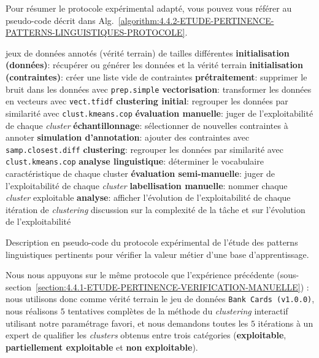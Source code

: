 			Pour résumer le protocole expérimental adapté, vous pouvez vous référer au pseudo-code décrit dans Alg.~\ref{algorithm:4.4.2-ETUDE-PERTINENCE-PATTERNS-LINGUISTIQUES-PROTOCOLE}.
			\begin{algorithm}[!htb]
				\begin{algorithmic}[1]
					\Require jeux de données annotés (vérité terrain) de tailles différentes
					\State \textbf{initialisation (données)}: récupérer ou générer les données et la vérité terrain
					\State \textbf{initialisation (contraintes)}: créer une liste vide de contraintes
					\State \textbf{prétraitement}: supprimer le bruit dans les données avec \texttt{prep.simple}
					\State \textbf{vectorisation}: transformer les données en vecteurs avec \texttt{vect.tfidf}
					\State \textbf{clustering initial}: regrouper les données par similarité avec \texttt{clust.kmeans.cop}
					\State \textbf{évaluation manuelle}: juger de l'exploitabilité de chaque \textit{cluster}
					\Repeat
						\State \textbf{échantillonnage}: sélectionner de nouvelles contraintes à annoter
						\State \textbf{simulation d'annotation}: ajouter des contraintes avec \texttt{samp.closest.diff}
						\State \textbf{clustering}: regrouper les données par similarité avec \texttt{clust.kmeans.cop}
						\State \textbf{analyse linguistique}: déterminer le vocabulaire caractéristique de chaque cluster
						\State \textbf{évaluation semi-manuelle}: juger de l'exploitabilité de chaque \textit{cluster}
						\State \textbf{labellisation manuelle}: nommer chaque \textit{cluster} exploitable
					\State \textbf{analyse}: afficher l'évolution de l'exploitabilité de chaque itération de \textit{clustering}
					\Ensure discussion sur la complexité de la tâche et sur l'évolution de l'exploitabilité
				\end{algorithmic}
				\caption{Description en pseudo-code du protocole expérimental de l'étude des patterns linguistiques pertinents pour vérifier la valeur métier d'une base d'apprentissage.}
				\label{algorithm:4.4.2-ETUDE-PERTINENCE-PATTERNS-LINGUISTIQUES-PROTOCOLE}
			\end{algorithm}
			
			Nous nous appuyons sur le même protocole que l'expérience précédente (sous-section~\ref{section:4.4.1-ETUDE-PERTINENCE-VERIFICATION-MANUELLE}) : nous utilisons donc comme vérité terrain le jeu de données \texttt{Bank Cards (v1.0.0)}, nous réalisons $5$ tentatives complètes de la méthode du \textit{clustering} interactif utilisant notre paramétrage favori, et nous demandons toutes les $5$ itérations à un expert de qualifier les \textit{clusters} obtenus entre trois catégories (\textbf{exploitable}, \textbf{partiellement exploitable} et \textbf{non exploitable}).
			
